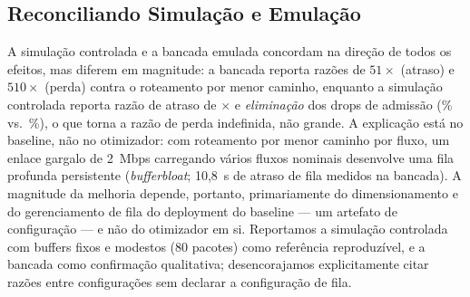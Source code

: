\documentclass[journal]{IEEEtran}
\begin{document}
\subsection{Reconciliando Simulação e Emulação}
\label{sec:bench}
A simulação controlada e a bancada emulada concordam na direção de todos os
efeitos, mas diferem em magnitude: a bancada reporta razões de $51\times$
(atraso) e $510\times$ (perda) contra o roteamento por menor caminho,
enquanto a simulação controlada reporta razão de atraso de
\SimDelayRatio$\times$ e \emph{eliminação} dos drops de admissão
(\SimLossOpt\% vs.\ \SimLossDj\%), o que torna a razão de perda indefinida,
não grande. A explicação está no baseline, não no otimizador: com
roteamento por menor caminho por fluxo, um enlace gargalo de 2~Mbps
carregando vários fluxos nominais desenvolve uma fila profunda persistente
(\emph{bufferbloat}; 10,8~s de atraso de fila medidos na bancada). A
magnitude da melhoria depende, portanto, primariamente do dimensionamento e
do gerenciamento de fila do deployment do baseline --- um artefato de
configuração --- e não do otimizador em si. Reportamos a simulação
controlada com buffers fixos e modestos (80 pacotes) como referência
reproduzível, e a bancada como confirmação qualitativa; desencorajamos
explicitamente citar razões entre configurações sem declarar a configuração
de fila.

\end{document}
